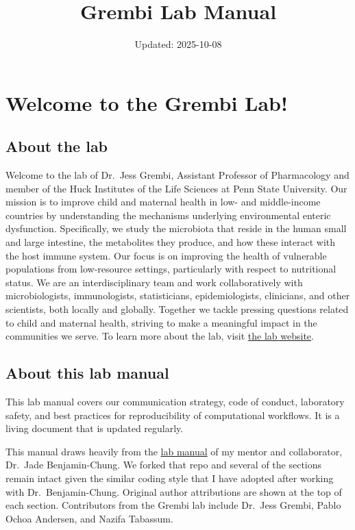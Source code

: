 \documentclass[
]{book}
\title{Grembi Lab Manual}
\author{}
\date{\vspace{-2.5em}Updated: 2025-10-08}
\begin{document}
\maketitle

{
\setcounter{tocdepth}{1}
\tableofcontents
}
\chapter{Welcome to the Grembi Lab!}\label{welcome-to-the-grembi-lab}

\section{About the lab}\label{about-the-lab}

Welcome to the lab of Dr.~Jess Grembi, Assistant Professor of Pharmacology and member of the Huck Institutes of the Life Sciences at Penn State University. Our mission is to improve child and maternal health in low- and middle-income countries by understanding the mechanisms underlying environmental enteric dysfunction. Specifically, we study the microbiota that reside in the human small and large intestine, the metabolites they produce, and how these interact with the host immune system. Our focus is on improving the health of vulnerable populations from low-resource settings, particularly with respect to nutritional status. We are an interdisciplinary team and work collaboratively with microbiologists, immunologists, statisticians, epidemiologists, clinicians, and other scientists, both locally and globally. Together we tackle pressing questions related to child and maternal health, striving to make a meaningful impact in the communities we serve. To learn more about the lab, visit \href{https://jgrembi.github.io}{the lab website}.

\section{About this lab manual}\label{about-this-lab-manual}

This lab manual covers our communication strategy, code of conduct, laboratory safety, and best practices for reproducibility of computational workflows. It is a living document that is updated regularly.

This manual draws heavily from the \href{https://jadebc.github.io/lab-manual/}{lab manual} of my mentor and collaborator, Dr.~Jade Benjamin-Chung. We forked that repo and several of the sections remain intact given the similar coding style that I have adopted after working with Dr.~Benjamin-Chung. Original author attributions are shown at the top of each section.
Contributors from the Grembi lab include Dr.~Jess Grembi, Pablo Ochoa Andersen, and Nazifa Tabassum.
\end{document}
